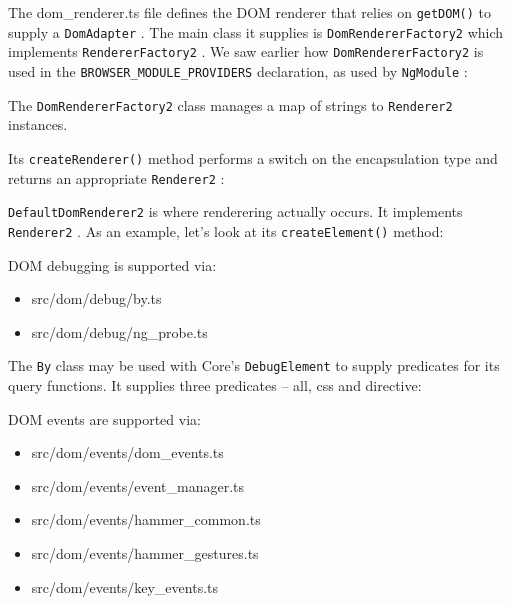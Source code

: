 

The dom\_renderer.ts file defines the DOM renderer that relies on
\texttt{getDOM()}
to supply
a
\texttt{DomAdapter}
. The main class it supplies is
\texttt{DomRendererFactory2}
which implements
\texttt{RendererFactory2}
. We saw earlier how
\texttt{DomRendererFactory2}
is used in the
\texttt{BROWSER\_MODULE\_PROVIDERS}
declaration, as used by
\texttt{NgModule}
:



The
\texttt{DomRendererFactory2}
class manages a map of strings to
\texttt{Renderer2}
instances.



Its
\texttt{createRenderer()}
method performs a switch on the encapsulation type and
returns an appropriate
\texttt{Renderer2}
:



\texttt{DefaultDomRenderer2}
is where renderering actually occurs. It implements
\texttt{Renderer2}
. As an example, let’s look at its
\texttt{createElement()}
method:



DOM debugging is supported via:

\begin{itemize}
  \item src/dom/debug/by.ts
  \item src/dom/debug/ng\_probe.ts
\end{itemize}

The
\texttt{By}
class may be used with Core’s
\texttt{DebugElement}
to supply predicates for its query
functions. It supplies three predicates – all, css and directive:



DOM events are supported via:

\begin{itemize}
  \item src/dom/events/dom\_events.ts
  \item src/dom/events/event\_manager.ts
  \item src/dom/events/hammer\_common.ts
  \item src/dom/events/hammer\_gestures.ts
  \item src/dom/events/key\_events.ts
\end{itemize}

